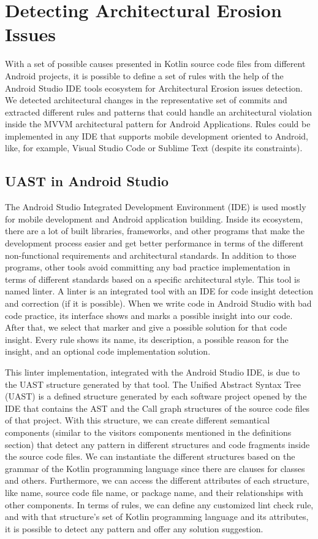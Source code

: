\chapter{Detecting Architectural Erosion Issues}
\label{cha:detection}

With a set of possible causes presented in Kotlin source code files from different Android projects, it is possible to define a set of rules with the help of the Android Studio IDE tools ecosystem for Architectural Erosion issues detection. We detected architectural changes in the representative set of commits and extracted different rules and patterns that could handle an architectural violation inside the MVVM architectural pattern for Android Applications. Rules could be implemented in any IDE that supports mobile development oriented to Android, like, for example, Visual Studio Code or Sublime Text (despite its constraints).


\section{UAST in Android Studio}
The Android Studio  Integrated Development Environment (IDE) is used mostly for mobile development and Android application building. Inside its ecosystem, there are a lot of built libraries, frameworks, and other programs that make the development process easier and get better performance in terms of the different non-functional requirements and architectural standards. In addition to those programs, other tools avoid committing any bad practice implementation in terms of different standards based on a specific architectural style. This tool is named linter. A linter is an integrated tool with an IDE for code insight detection and correction  (if it is possible). When we write code in Android Studio with bad code practice, its interface shows and marks a possible insight into our code. After that, we select that marker and give a possible solution for that code insight. Every rule shows its name, its description, a possible reason for the insight, and an optional code implementation solution.

This linter implementation, integrated with the Android Studio IDE, is due to the UAST structure generated by that tool. The Unified Abstract Syntax Tree (UAST) is a defined structure generated by each software project opened by the IDE that contains the AST and the Call graph structures of the source code files of that project. With this structure, we can create different semantical components (similar to the visitors components mentioned in the definitions section) that detect any pattern in different structures and code fragments inside the source code files. We can instantiate the different structures based on the grammar of the Kotlin programming language since there are clauses for classes and others. Furthermore, we can access the different attributes of each structure, like name, source code file name, or package name, and their relationships with other components. In terms of rules, we can define any customized lint check rule, and with that structure's set of Kotlin programming language and its attributes, it is possible to detect any pattern and offer any solution suggestion.

